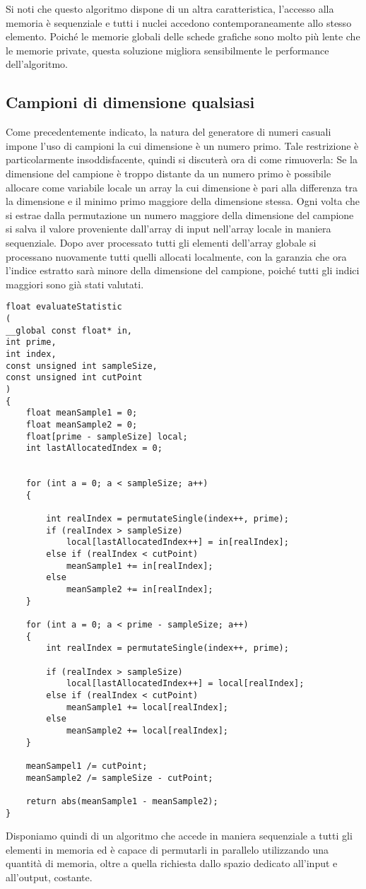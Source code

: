 Si noti che questo algoritmo dispone di un altra caratteristica, l'accesso alla memoria è sequenziale e tutti i nuclei accedono contemporaneamente allo stesso elemento. Poiché le memorie globali delle schede grafiche sono molto più lente che le memorie private, questa soluzione migliora sensibilmente le performance dell'algoritmo.

\subsection{Campioni di dimensione qualsiasi}
Come precedentemente indicato, la natura del generatore di numeri casuali impone l'uso di campioni la cui dimensione è un numero primo. Tale restrizione è particolarmente insoddisfacente, quindi si discuterà ora di come rimuoverla:
Se la dimensione del campione è troppo distante da un numero primo è possibile allocare come variabile locale un array la cui dimensione è pari alla differenza tra la dimensione e il minimo primo maggiore della dimensione stessa. Ogni volta che si estrae dalla permutazione un numero maggiore della dimensione del campione si salva il valore proveniente dall'array di input nell'array locale in maniera sequenziale. Dopo aver processato tutti gli elementi dell'array globale si processano nuovamente tutti quelli allocati localmente, con la garanzia che ora l'indice estratto sarà minore della dimensione del campione, poiché tutti gli indici maggiori sono già stati valutati.


\begin{lstlisting}[style=CStyle]
float evaluateStatistic
(
__global const float* in,
int prime,
int index,
const unsigned int sampleSize, 
const unsigned int cutPoint
)
{
	float meanSample1 = 0;
	float meanSample2 = 0;
	float[prime - sampleSize] local;
	int lastAllocatedIndex = 0;
	
	
	for (int a = 0; a < sampleSize; a++)
	{
	
		int realIndex = permutateSingle(index++, prime);
		if (realIndex > sampleSize)
			local[lastAllocatedIndex++] = in[realIndex];
		else if (realIndex < cutPoint)
			meanSample1 += in[realIndex];
		else
			meanSample2 += in[realIndex];
	}
	
	for (int a = 0; a < prime - sampleSize; a++)
	{
		int realIndex = permutateSingle(index++, prime);
		
		if (realIndex > sampleSize)
			local[lastAllocatedIndex++] = local[realIndex];
		else if (realIndex < cutPoint)
			meanSample1 += local[realIndex];	
		else
			meanSample2 += local[realIndex];
	}
	
	meanSampel1 /= cutPoint;
	meanSample2 /= sampleSize - cutPoint;	
	
	return abs(meanSample1 - meanSample2);
}
\end{lstlisting}


Disponiamo quindi di un algoritmo che accede in maniera sequenziale a tutti gli elementi in memoria ed è capace di permutarli in parallelo utilizzando una quantità di memoria, oltre a quella richiesta dallo spazio dedicato all'input e all'output, costante.